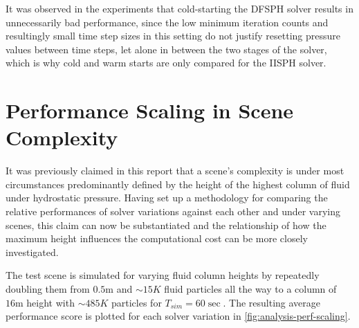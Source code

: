 \documentclass[oneside, a4paper]{book}
\begin{document}
  It was observed in the experiments that cold-starting the DFSPH solver results in unnecessarily bad performance, since the low minimum iteration counts and resultingly small time step sizes in this setting do not justify resetting pressure values between time steps, let alone in between the two stages of the solver, which is why cold and warm starts are only compared for the IISPH solver.




  \section{Performance Scaling in Scene Complexity}
  It was previously claimed in this report that a scene's complexity is under most circumstances predominantly defined by the height of the highest column of fluid under hydrostatic pressure. Having set up a methodology for comparing the relative performances of solver variations against each other and under varying scenes, this claim can now be substantiated and the relationship of how the maximum height influences the computational cost can be more closely investigated.

  The test scene is simulated for varying fluid column heights by repeatedly doubling them from $0.5\text{m}$ and $\sim15K$ fluid particles all the way to a column of $16\text{m}$ height with $\sim485K$ particles for $T_{sim}=60\sec$. The resulting average performance score is plotted for each solver variation in \autoref{fig:analysis-perf-scaling}. 
\end{document}
